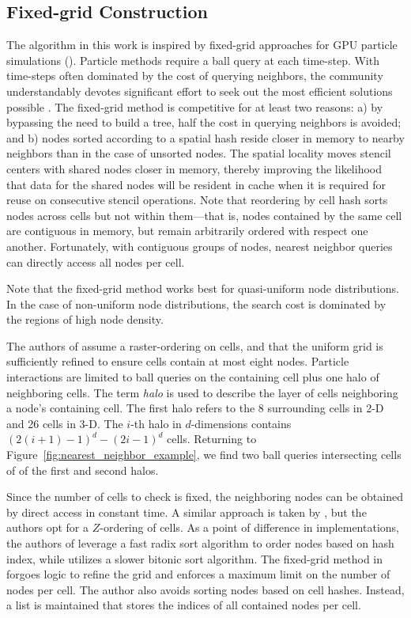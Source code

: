 \documentclass{report}
\begin{document}
\subsection{Fixed-grid Construction}
The algorithm in this work is inspired by fixed-grid approaches for GPU particle simulations (\cite{Krog2010,Green2010,Johnson2011}). Particle methods require a ball query at each time-step. With time-steps often dominated by the cost of querying neighbors, the community understandably devotes significant effort to seek out the most efficient solutions possible \cite{Goswami2010}. The fixed-grid method is competitive for at least two reasons: a) by bypassing the need to build a tree, half the cost in querying neighbors is avoided; and b) nodes sorted according to a spatial hash reside closer in memory to nearby neighbors than in the case of unsorted nodes. The spatial locality moves stencil centers with shared nodes closer in memory, thereby improving the likelihood that data for the shared nodes will be resident in cache when it is required for reuse on consecutive stencil operations. 
Note that reordering by cell hash sorts nodes across cells but not within them---that is, nodes contained by the same cell are contiguous in memory, but remain arbitrarily ordered with respect one another. Fortunately, with contiguous groups of nodes, nearest neighbor queries can directly access all nodes per cell. 

Note that the fixed-grid method works best for quasi-uniform node distributions. In the case of non-uniform node distributions, the search cost is dominated by the regions of high node density.


The authors of \cite{Krog2010,Johnson2011,Green2010} assume a raster-ordering on cells, and that the uniform grid is sufficiently refined to ensure cells contain at most eight nodes. Particle interactions are limited to ball queries on the containing cell plus one halo of neighboring cells. The term \emph{halo} is used to describe the layer of cells neighboring a node's containing cell. The first halo refers to the 8 surrounding cells in 2-D and 26 cells in 3-D. The $i$-th halo in $d$-dimensions contains $\left(2(i+1)-1\right)^d - \left(2i - 1\right)^d$ cells. Returning to Figure~\ref{fig:nearest_neighbor_example}, we find two ball queries intersecting cells of of the first and second halos.


Since the number of cells to check is fixed, the neighboring nodes can be obtained by direct access in constant time. A similar approach is taken by \cite{Goswami2010}, but the authors opt for a $Z$-ordering of cells. 
 As a point of difference in implementations, the authors of \cite{Green2010, Krog2010, Goswami2010} leverage a fast radix sort algorithm to order nodes based on hash index, while \cite{Johnson2011} utilizes a slower bitonic sort algorithm. The fixed-grid method in \cite{Wendland2002,WendlandBook} forgoes logic to refine the grid and enforces a maximum limit on the number of nodes per cell. The author also avoids sorting nodes based on cell hashes. Instead, a list is maintained that stores the indices of all contained nodes per cell. %
\end{document}
